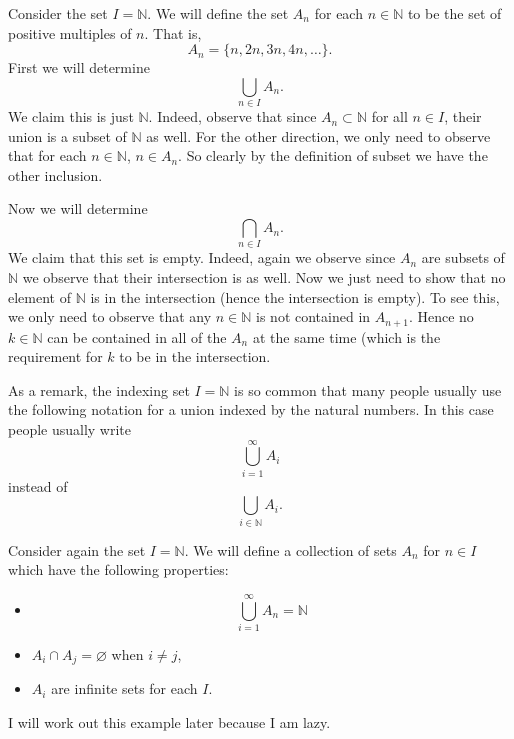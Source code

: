 \begin{example}
Consider the set $I = \mathbb{N}$. We will define the set $A_n$ for each $n \in \mathbb{N}$ to be the set of positive multiples of $n$. That is,
\[A_n = \{n, 2n, 3n, 4n, \dots\}.\]
First we will determine 
\[\bigcup_{n \in I}A_n.\] We claim this is just $\mathbb{N}$. Indeed, observe that since $A_n \subset \mathbb{N}$ for all $n \in I$, their union is a subset of $\mathbb{N}$ as well. For the other direction, we only need to observe that for each $n \in \mathbb{N}$, $n \in A_n$. So clearly by the definition of subset we have the other inclusion. %

Now we will determine
\[\bigcap_{n \in I}A_n.\] We claim that this set is empty. Indeed, again we observe since $A_n$ are subsets of $\mathbb{N}$ we observe that their intersection is as well. Now we just need to show that no element of $\mathbb{N}$ is in the intersection (hence the intersection is empty). To see this, we only need to observe that any $n \in \mathbb{N}$ is not contained in $A_{n + 1}$. Hence no $k \in \mathbb{N}$ can be contained in all of the $A_n$ at the same time (which is the requirement for $k$ to be in the intersection.
\end{example}

As a remark, the indexing set $I = \mathbb{N}$ is so common that many people usually use the following notation for a union indexed by the natural numbers. In this case people usually write
\[\bigcup_{i = 1}^\infty A_i\] instead of 
\[\bigcup_{i \in \mathbb{N}}A_i.\]


\begin{example}
Consider again the set $I = \mathbb{N}$. We will define a collection of sets $A_n$ for $n \in I$ which have the following properties:
\begin{itemize}
	\item \[\bigcup_{i = 1}^{\infty}A_n = \mathbb{N}\]
	\item $A_i \cap A_j = \varnothing$ when $i \neq j$,
	\item $A_i$ are infinite sets for each $I$. 
\end{itemize}

I will work out this example later because I am lazy.
\end{example}